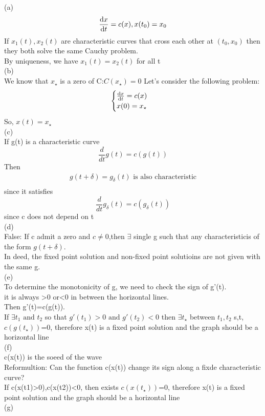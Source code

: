 \begin{solution}
(a)\\
$$\dv{x}{t}=c(x),x(t_0)=x_0$$
If $ x_1(t),x_2(t) $ are characteristic curves that cross each other at $ (t_0,x_0) $   then they both solve the same Cauchy problem.
\\By uniqueness, we have $ x_1(t)=x_2(t) $ for all t
\\(b)\\
We know that $ x_\star $ is a zero of C:$ C(x_\star)=0 $ Let's consider the following problem:$$
    \begin{cases}
        \dv{x}{t}=c(x)\\
        x(0)=x_\star
    \end{cases}
$$  
So, $ x(t)=x_\star $\\
(c) \\
If g(t) is a characteristic curve$$
    \frac{d}{dt}g(t)=c(g(t))
$$ 
Then \begin{align*}{}{}
g(t+\delta)=g_\delta(t) \text{ is also characteristic}\\
\end{align*}
since it satisfies $$
    \frac{d}{dt}g_\delta(t)=c(g_\delta(t))
$$ since c does not depend on t
\\(d)\\
False: If c admit a zero and $c\neq 0$,then $ \exists $ single g such that any characteristicis of the form $ g(t+\delta) $.\\
In deed, the fixed point solution and non-fixed point solutioins are not given with the same g.  
\\(e)\\
To determine the monotonicity of g, we need to check the sign of g'(t).\\
it is always >0 or<0 in between the horizontal lines.\\
Then g'(t)=c(g(t)).\\
If $ \exists t_1 \text{ and }t_2$ so that $ g'(t_1)>0 \text{ and }g'(t_2) <0$ then $ \exists t_\star$ between $ t_1,t_2 $ s,t, $c(g(t_\star)) $=0, therefore x(t) is a fixed point solution and the graph should be a horizontal line\\
(f)\\
c(x(t)) is the soeed of the wave   \\
Reformultion: Can the function c(x(t)) change its sign along a fixde characteristic curve?\\
If c(x(t1)>0),c(x(t2))<0, then exists $c(x(t_\star)) $=0, therefore x(t) is a fixed point solution and the graph should be a horizontal line\\
(g)\\

\end{solution}
